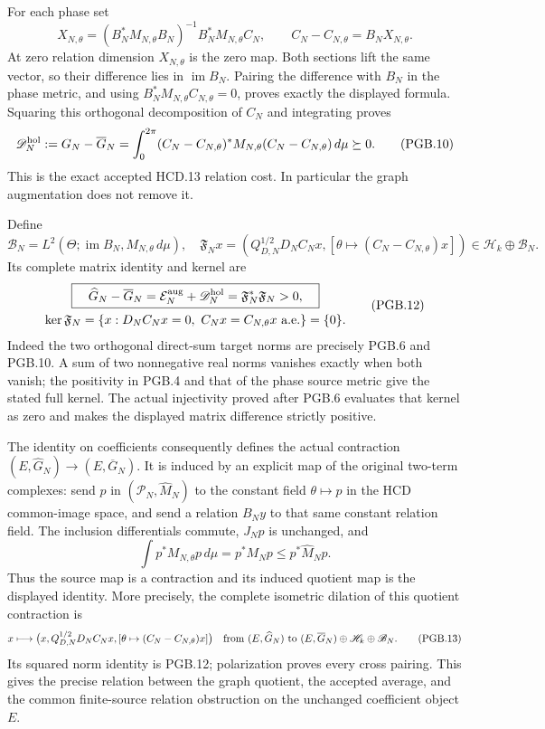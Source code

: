 For each phase set
\[
 X_{N,\theta}=(B_N^*M_{N,\theta}B_N)^{-1}
                          B_N^*M_{N,\theta}C_N,
 \qquad C_N-C_{N,\theta}=B_NX_{N,\theta}.
 \tag{PGB.9}\label{GraphV2:eq:pgb-original-relation-field}
\]
At zero relation dimension $X_{N,\theta}$ is the zero map.
Both sections lift the same vector, so their difference lies in
$\operatorname{im}B_N$. Pairing the difference with $B_N$ in
the phase metric, and using $B_N^*M_{N,\theta}C_{N,\theta}=0$,
proves exactly the displayed formula. Squaring this orthogonal
decomposition of $C_N$ and integrating proves
\[
 \mathscr D_N^{\rm hol}:=G_N-\overline G_N
 =\int_0^{2\pi}(C_N-C_{N,\theta})^*M_{N,\theta}
                      (C_N-C_{N,\theta})\,d\mu\succeq0.
 \tag{PGB.10}\label{GraphV2:eq:pgb-original-gap}
\]
This is the exact accepted HCD.13 relation cost. In particular
the graph augmentation does not remove it.

Define
\[
 \mathscr B_N=L^2(\Theta;\operatorname{im}B_N,
                                  M_{N,\theta}\,d\mu),
 \quad
 \mathfrak F_Nx=
 \left(Q_{D,N}^{1/2}D_NC_Nx,
       [\theta\mapsto(C_N-C_{N,\theta})x]\right)
 \in\mathscr H_k\oplus\mathscr B_N.
 \tag{PGB.11}\label{GraphV2:eq:pgb-full-defect-map}
\]
Its complete matrix identity and kernel are
\[
 \begin{gathered}
 \boxed{\quad
 \widehat G_N-\overline G_N
 =\mathcal E_N^{\rm aug}+\mathscr D_N^{\rm hol}
 =\mathfrak F_N^*\mathfrak F_N>0,\quad}\\
 \ker\mathfrak F_N
 =\{x:D_NC_Nx=0,\ C_Nx=C_{N,\theta}x\text{ a.e.}\}=\{0\}.
 \end{gathered}
 \tag{PGB.12}\label{GraphV2:eq:pgb-main-bridge}
\]
Indeed the two orthogonal direct-sum target norms are precisely
PGB.6 and PGB.10. A sum of two nonnegative real norms vanishes
exactly when both vanish; the positivity in PGB.4 and that of
the phase source metric give the stated full kernel.
The actual injectivity proved after PGB.6 evaluates that kernel
as zero and makes the displayed matrix difference strictly positive.

The identity on coefficients consequently defines the actual
contraction $(E,\widehat G_N)\to(E,\overline G_N)$. It is
induced by an explicit map of the original two-term complexes:
send $p$ in $(\mathcal P_N,\widehat M_N)$ to the constant
field $\theta\mapsto p$ in the HCD common-image space, and
send a relation $B_Ny$ to that same constant relation field.
The inclusion differentials commute, $J_Np$ is unchanged, and
\[
 \int p^*M_{N,\theta}p\,d\mu=p^*M_Np
                  \leq p^*\widehat M_Np.
\]
Thus the source map is a contraction and its induced quotient
map is the displayed identity. More precisely, the complete
isometric dilation of this quotient contraction is
\[
 x\longmapsto
 \bigl(x,Q_{D,N}^{1/2}D_NC_Nx,
             [\theta\mapsto(C_N-C_{N,\theta})x]\bigr)
 \quad\hbox{from }(E,\widehat G_N)
 \hbox{ to }(E,\overline G_N)\oplus\mathscr H_k\oplus\mathscr B_N.
 \tag{PGB.13}\label{GraphV2:eq:pgb-isometric-dilation}
\]
Its squared norm identity is PGB.12; polarization proves every
cross pairing. This gives the precise relation between the graph
quotient, the accepted average, and the common finite-source
relation obstruction on the unchanged coefficient object $E$.

